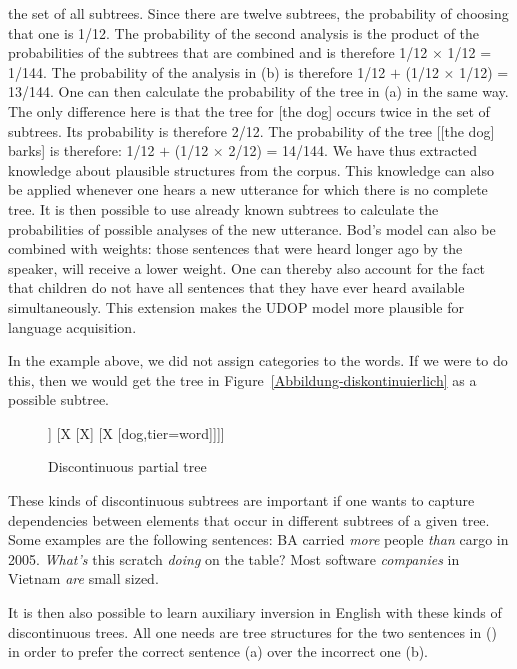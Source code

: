 the set of all subtrees. Since there are twelve subtrees, the probability of choosing that one is 1/12. The probability of the second
analysis is the product of the probabilities of the subtrees that are combined and is therefore 1/12
$\times$ 1/12 = 1/144.
The probability of the analysis in (b) is therefore 1/12 $+$ (1/12 $\times$ 1/12) = 13/144.
One can then calculate the probability of the tree in (a) in the same way. The only difference here is that the tree for
[the dog] occurs twice in the set of subtrees. Its probability is therefore
 2/12. The probability of the tree [[the dog] barks] is therefore:
1/12 $+$ (1/12 $\times$ 2/12) = 14/144. We have thus extracted knowledge about plausible structures from the corpus. This knowledge can
also  be applied whenever one hears a new utterance for which there is no complete tree. It is then possible to use already known
 subtrees to calculate the probabilities of possible analyses of the new utterance.
Bod's model can also be combined with weights: those sentences that were heard longer ago by the speaker, will receive a lower weight.
One can thereby also account for the fact that children do not  have all sentences that they have ever heard available simultaneously. 
This extension makes the UDOP model more plausible for language acquisition.

\largerpage
In the example above, we did not assign categories to the words. If we were to do this, then we
would get the tree in Figure~\vref{Abbildung-diskontinuierlich} as a possible
subtree.
\begin{figure}
\centering
\begin{forest}
[X
	[X
		[watch,tier=word]]
	[X
		[X]
		[X
			[dog,tier=word]]]]
\end{forest}
\caption{\label{Abbildung-diskontinuierlich}Discontinuous partial tree}
\end{figure}%
These kinds of discontinuous subtrees are important if one wants to capture dependencies between elements that occur in different subtrees
of a given tree. Some examples are the following sentences:
\eal
\ex BA carried \emph{more} people \emph{than} cargo in 2005.
\ex \emph{What's} this scratch \emph{doing} on the table?
\ex Most software \emph{companies} in Vietnam \emph{are} small sized.
\zl

\noindent
It is then also possible to learn auxiliary inversion in English with these kinds of discontinuous
trees. All one needs are tree structures for the two sentences in () in order to prefer the correct sentence (a) over the incorrect one (b).

